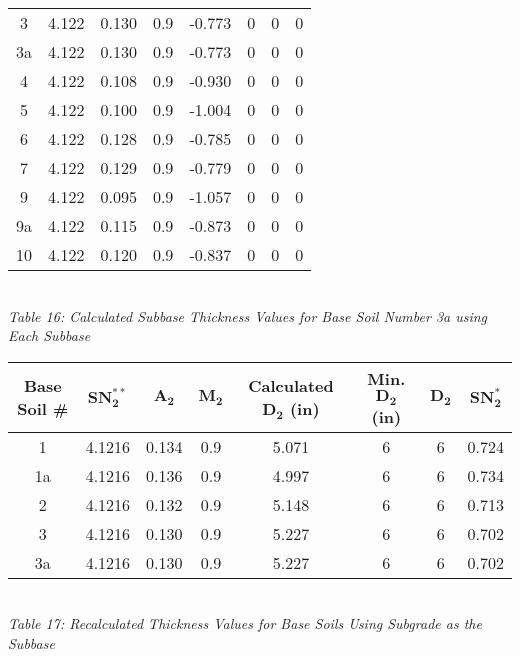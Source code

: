 \documentclass{article}
\begin{document}
\begin{center}
\begin{spacing}{1.6}
\begin{tabular}{|c|ccccccc|}
             3  & 4.122 & 0.130 & 0.9 & -0.773 & 0 & 0&0  \\
             3a & 4.122 & 0.130 & 0.9 & -0.773 & 0 & 0&0  \\
             4  & 4.122 & 0.108 & 0.9 & -0.930 & 0 & 0&0  \\
             5  & 4.122 & 0.100 & 0.9 & -1.004 & 0 & 0&0  \\
             6  & 4.122 & 0.128 & 0.9 & -0.785 & 0 & 0&0  \\
             7  & 4.122 & 0.129 & 0.9 & -0.779 & 0 & 0&0  \\
             9  & 4.122 & 0.095 & 0.9 & -1.057 & 0 & 0&0  \\
             9a & 4.122 & 0.115 & 0.9 & -0.873 & 0 & 0&0  \\
             10 & 4.122 & 0.120 & 0.9 & -0.837 & 0 & 0&0 \\\hline
        \end{tabular}
        \vspace{3mm}
        \emph{\\Table 16: Calculated Subbase Thickness Values for Base Soil Number 3a using Each Subbase\\}
    \end{spacing}
    \newpage 
    \begin{tabular}{|c|ccccccc|}
        \hline
        \textbf{Base Soil \#} & $\bm{SN_2^{**}}$ & $\bm{A_2}$ & $\bm{M_2}$ & \textbf{Calculated $\bm{D_2}$ (in)} & \textbf{Min. $\bm{D_2}$ (in)} & $\bm{D_2}$ & $\bm{SN_2^*}$  \\\hline
        1  & 4.1216 & 0.134 & 0.9 & 5.071 & 6 & 6 & 0.724  \\
        1a & 4.1216 & 0.136 & 0.9 & 4.997 & 6 & 6 & 0.734  \\
        2  & 4.1216 & 0.132 & 0.9 & 5.148 & 6 & 6 & 0.713  \\
        3  & 4.1216 & 0.130 & 0.9 & 5.227 & 6 & 6 & 0.702  \\
        3a & 4.1216 & 0.130 & 0.9 & 5.227 & 6 & 6 & 0.702 \\\hline
    \end{tabular}
    \vspace{3mm}
    \emph{\\Table 17: Recalculated Thickness Values for Base Soils Using Subgrade as the Subbase\\}

\end{center}
\end{document}
